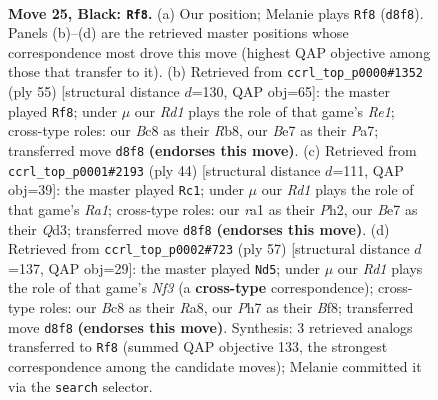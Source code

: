 \documentclass[11pt]{article}
\begin{document}
\clearpage

\begin{figure}[p]\centering
\begin{subfigure}{0.46\textwidth}\centering
\resizebox{\linewidth}{!}{%
\newchessgame
\chessboard[
  setfen={r1br2k1/p2nb2p/2p5/3q4/Pp1p1P2/1P6/2QNPK2/RNBR4 b - - 2 25},
  showmover=false,
  pgfstyle=straightmove, color=movearrow, markmove={d8-f8}
]}
\caption{}
\end{subfigure}\hfill
\begin{subfigure}{0.46\textwidth}\centering
\resizebox{\linewidth}{!}{%
\newchessgame
\chessboard[
  setfen={1r2r1k1/pp1q2bp/6p1/P2Pp3/2pnN3/2N3Q1/1P4PP/R4R1K b - - 4 28},
  showmover=false,
  pgfstyle=straightmove, color=movearrow, markmove={e8-f8}
]}
\caption{}
\end{subfigure}
\\[4pt]
\begin{subfigure}{0.46\textwidth}\centering
\resizebox{\linewidth}{!}{%
\newchessgame
\chessboard[
  setfen={rn1r2k1/2q1bpp1/2P2n2/pB1P4/P6p/1N1QB3/1P4PP/R3K1R1 w Q - 1 23},
  showmover=false,
  pgfstyle=straightmove, color=movearrow, markmove={a1-c1}
]}
\caption{}
\end{subfigure}\hfill
\begin{subfigure}{0.46\textwidth}\centering
\resizebox{\linewidth}{!}{%
\newchessgame
\chessboard[
  setfen={r4bk1/1qr2p2/4pn1p/p3N1p1/Q1N5/2P3P1/1P3PP1/3RR1K1 b - - 3 29},
  showmover=false,
  pgfstyle=straightmove, color=movearrow, markmove={f6-d5}
]}
\caption{}
\end{subfigure}
\caption{\textbf{Move 25, Black: \texttt{Rf8}.} (a) Our position; Melanie plays \texttt{Rf8} (\texttt{d8f8}). Panels (b)--(d) are the retrieved master positions whose correspondence most drove this move (highest QAP objective among those that transfer to it). (b) Retrieved from \texttt{ccrl\_top\_p0000\#1352} (ply 55) [structural distance $d$=130, QAP obj=65]: the master played \texttt{Rf8}; under $\mu$ our \emph{Rd1} plays the role of that game's \emph{Re1}; cross-type roles: our \emph{B}c8 as their \emph{R}b8, our \emph{B}e7 as their \emph{P}a7; transferred move \texttt{d8f8} \textbf{(endorses this move)}. (c) Retrieved from \texttt{ccrl\_top\_p0001\#2193} (ply 44) [structural distance $d$=111, QAP obj=39]: the master played \texttt{Rc1}; under $\mu$ our \emph{Rd1} plays the role of that game's \emph{Ra1}; cross-type roles: our \emph{r}a1 as their \emph{P}h2, our \emph{B}e7 as their \emph{Q}d3; transferred move \texttt{d8f8} \textbf{(endorses this move)}. (d) Retrieved from \texttt{ccrl\_top\_p0002\#723} (ply 57) [structural distance $d$=137, QAP obj=29]: the master played \texttt{Nd5}; under $\mu$ our \emph{Rd1} plays the role of that game's \emph{Nf3} (a \textbf{cross-type} correspondence); cross-type roles: our \emph{B}c8 as their \emph{R}a8, our \emph{P}h7 as their \emph{B}f8; transferred move \texttt{d8f8} \textbf{(endorses this move)}. Synthesis: 3 retrieved analogs transferred to \texttt{Rf8} (summed QAP objective 133, the strongest correspondence among the candidate moves); Melanie committed it via the \texttt{search} selector.}
\label{fig:thought-m49}
\end{figure}
\end{document}
